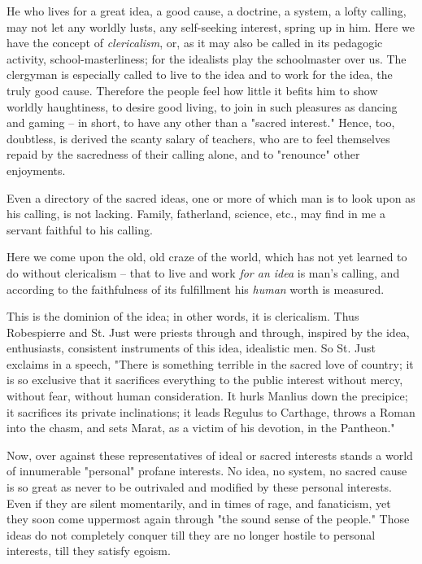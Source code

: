 \documentclass[a4paper]{book}
\begin{document}
He who lives for a great idea, a good cause, a doctrine, a system, a lofty 
calling, may not let any worldly lusts, any self-seeking interest, spring up 
in him. Here we have the concept of \textit{clericalism}, or, as it may also 
be called in its pedagogic activity, school-masterliness; for the idealists 
play the schoolmaster over us. The clergyman is especially called to live to 
the idea and to work for the idea, the truly good cause. Therefore the people 
feel how little it befits him to show worldly haughtiness, to desire good 
living, to join in such pleasures as dancing and gaming -- in short, to have 
any other than a "{}sacred interest."{} Hence, too, doubtless, is derived the 
scanty salary of teachers, who are to feel themselves repaid by the sacredness 
of their calling alone, and to "{}renounce"{} other enjoyments.

Even a directory of the sacred ideas, one or more of which man is to look upon 
as his calling, is not lacking. Family, fatherland, science, etc., may find in 
me a servant faithful to his calling.

Here we come upon the old, old craze of the world, which has not yet learned 
to do without clericalism -- that to live and work \textit{for an idea} is 
man's calling, and according to the faithfulness of its fulfillment his 
\textit{human} worth is measured.

This is the dominion of the idea; in other words, it is clericalism. Thus 
Robespierre and St. Just were priests through and through, inspired by the 
idea, enthusiasts, consistent instruments of this idea, idealistic men. So St. 
Just exclaims in a speech, "{}There is something terrible in the sacred love 
of country; it is so exclusive that it sacrifices everything to the public 
interest without mercy, without fear, without human consideration. It hurls 
Manlius down the precipice; it sacrifices its private inclinations; it leads 
Regulus to Carthage, throws a Roman into the chasm, and sets Marat, as a 
victim of his devotion, in the Pantheon."{}

Now, over against these representatives of ideal or sacred interests stands a 
world of innumerable "{}personal"{} profane interests. No idea, no system, no 
sacred cause is so great as never to be outrivaled and modified by these 
personal interests. Even if they are silent momentarily, and in times of rage, 
and fanaticism, yet they soon come uppermost again through "{}the sound sense 
of the people."{} Those ideas do not completely conquer till they are no 
longer hostile to personal interests, till they satisfy egoism.
\end{document}
